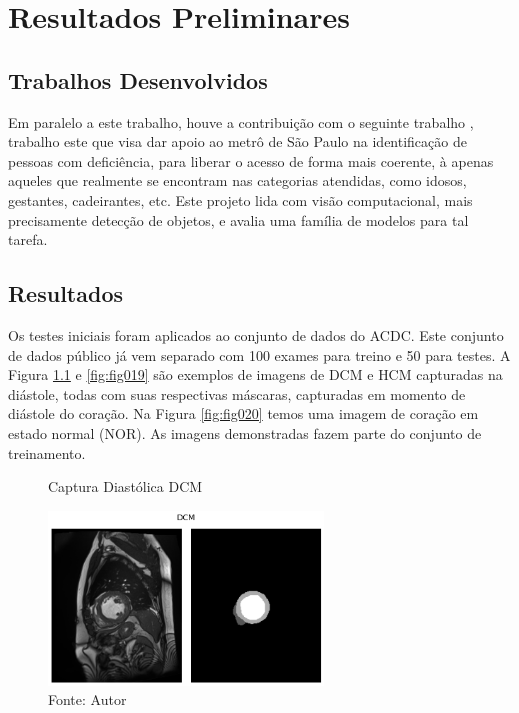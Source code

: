\chapter{Resultados  Preliminares}
\label{chap:resultados_discussao}

\section{Trabalhos Desenvolvidos} 
\label{sec:cap6_trabalhos_desenvolvidos}

Em paralelo a este trabalho, houve a contribuição com o seguinte trabalho \cite{adornoAutomaticDetectionPeople2023}, trabalho este que visa dar apoio ao metrô de São Paulo na identificação de pessoas com deficiência, para liberar o acesso de forma mais coerente, à apenas aqueles que realmente se encontram nas categorias atendidas, como idosos, gestantes, cadeirantes, etc. Este projeto lida com visão computacional, mais precisamente detecção de objetos, e avalia uma família de modelos para tal tarefa.


\section{Resultados} 
\label{sec:cap6_resultados}

Os testes iniciais foram aplicados ao conjunto de dados do \gls{ACDC}. Este conjunto de dados público já vem separado com 100 exames para treino e 50 para testes. A Figura \ref{fig:fig018} e \ref{fig:fig019} são exemplos de imagens de \gls{DCM} e \gls{HCM} capturadas na diástole, todas com suas respectivas máscaras, capturadas em momento de diástole do coração. Na Figura \ref{fig:fig020} temos uma imagem de coração em estado normal (\gls{NOR}). As imagens demonstradas fazem parte do conjunto de treinamento.

\begin{figure}[htbp]
    \caption{Captura Diastólica DCM}
    \centering
    \includegraphics[width=0.65\textwidth]{figures/fig018.png}
    \caption{Fonte: Autor}
    \label{fig:fig018}
\end{figure}

